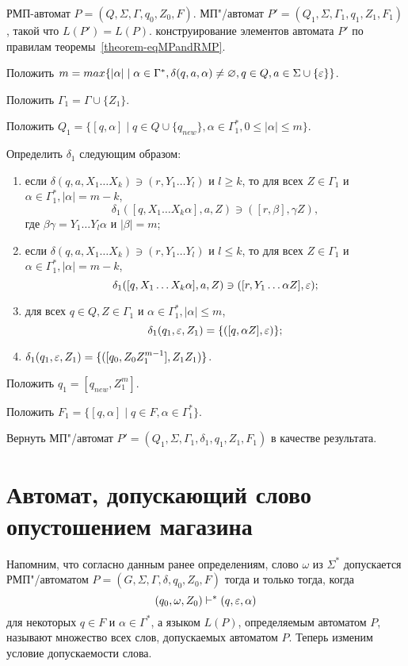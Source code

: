 {\label{algo-RMPtoMP} РМП-автомат $P = (Q, \Sigma, \Gamma, q_0, Z_0, F)$. }
{МП"/автомат $P' = (Q_1, \Sigma, \Gamma_1, q_1, Z_1, F_1)$, такой что $L(P') = L(P).$}
{ конструирование элементов автомата $P'$ по правилам теоремы~\ref{theorem-eqMPandRMP}.}
{
\item Положить $m = max \{|\alpha| \mid \alpha \in \Gamma^*, \delta(q, a, \alpha) \neq \varnothing, q \in Q, a \in \Sigma \cup \{\varepsilon\}\}$.

\item Положить $\Gamma_1 = \Gamma \cup \{Z_1\}$.

\item Положить $Q_1 = \{ [q, \alpha] \mid q \in Q \cup \{ q_{new} \}, \alpha \in \Gamma_1^*, 0 \leq|\alpha| \leq m \}$.

\item Определить $\delta_1$ следующим образом:
	\begin{enumerate}[itemindent=\parindent,leftmargin=!]
		\item если $\delta(q, a, X_1 \ldots X_k) \ni (r, Y_1 \ldots Y_l)$ и $l \geq k$, то для всех $Z \in \Gamma_1$ и $\alpha \in \Gamma_1^*, |\alpha| = m - k$,
		\[
			\delta_1([q, X_1 \ldots X_k\alpha], a, Z) \ni ([r, \beta], \gamma Z),
		\]
		где $\beta\gamma = Y_1\ldots Y_l\alpha$ и $|\beta| = m $;
		\item если $\delta(q, a, X_1 \ldots X_k) \ni (r, Y_1 \ldots Y_l)$ и $l \le k$, то для всех $Z \in \Gamma_1$ и $\alpha \in \Gamma_1^*, |\alpha| = m - k$,
		\[
			\delta_1([q, X_1 \ldots X_k\alpha], a, Z) \ni ([r, Y_1 \ldots \alpha Z], \varepsilon);
		\]
		\item для всех $q \in Q, Z \in \Gamma_1$ и $\alpha \in \Gamma_1^*, |\alpha| \le m$,
		\[
			\delta_1(q_1, \varepsilon, Z_1) = \{ ([q, \alpha Z], \varepsilon) \};
		\]
		\item $\delta_1(q_1, \varepsilon, Z_1) = \{ ([q_0, Z_0Z_1^{m-1}], Z_1Z_1) \}$.
  \end{enumerate}  
\item Положить $q_1 = [q_{new}, Z_1^m]$.

\item Положить $F_1 = \{ [q, \alpha] \mid q \in F, \alpha \in \Gamma_1^* \}$.

\item Вернуть МП"/автомат $P' = (Q_1, \Sigma, \Gamma_1, \delta_1, q_1, Z_1, F_1)$ в качестве результата.
} 

\section{Автомат, допускающий слово опустошением магазина }
\label{MPeps-fsm}
Напомним, что согласно данным ранее определениям, слово $\omega$ из
$\Sigma^*$ допускается РМП"/автоматом $P=
(G,\Sigma,\Gamma,\delta,q_0,Z_0,F)$ тогда и только тогда, когда
\[
(q_0,\omega,Z_0)\vdash^*(q,\varepsilon,\alpha)
\]
для некоторых $q\in F$ и
$\alpha\in\Gamma^*$, а языком $L(P)$, определяемым автоматом $P$,
называют множество всех слов, допускаемых автоматом $P$. Теперь изменим условие допускаемости слова.


